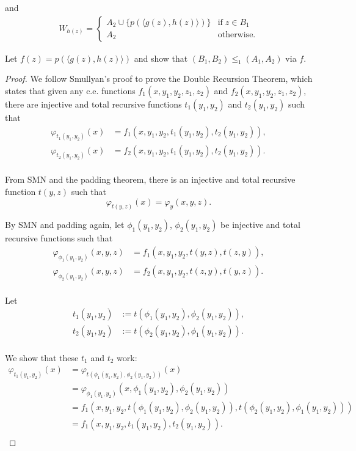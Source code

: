 \documentclass{article}
\begin{document}
\begin{enumerate}[label={\bf Q\arabic*:}]
    and
    \begin{align*}
      W_{h(z)}=
      \begin{cases}
        A_2\cup\{p(\langle g(z),h(z)\rangle)\} &\text{if}\; z\in B_1\\
        A_2 &\text{otherwise}.
      \end{cases}
    \end{align*}

    Let $f(z)=p(\langle g(z),h(z)\rangle)$ and show that
    $(B_1,B_2)\leq_1(A_1,A_2)$ via $f$.

    \begin{proof}
      We follow Smullyan's proof to prove the Double Recursion Theorem,
      which states that given any c.e. functions
      $f_1(x,y_1,y_2,z_1,z_2)$ and $f_2(x,y_1,y_2,z_1,z_2)$, there are
      injective and total recursive functions $t_1(y_1,y_2)$ and
      $t_2(y_1,y_2)$ such that
      \begin{align*}
        \varphi_{t_1(y_1,y_2)}(x)
          &=f_1(x,y_1,y_2,t_1(y_1,y_2),t_2(y_1,y_2)),\\
        \varphi_{t_2(y_1,y_2)}(x)
          &=f_2(x,y_1,y_2,t_1(y_1,y_2),t_2(y_1,y_2)).\\
      \end{align*}

      From SMN and the padding theorem, there is an injective and total
      recursive function $t(y,z)$ such that
      \[\varphi_{t(y,z)}(x) =\varphi_y(x,y,z).\]

      By SMN and padding again, let $\phi_1(y_1,y_2)$, $\phi_2(y_1,y_2)$ be
      injective and total recursive functions such that
      \begin{align*}
        \varphi_{\phi_1(y_1,y_2)}(x,y,z) &=f_1(x,y_1,y_2,t(y,z),t(z,y)),\\
        \varphi_{\phi_2(y_1,y_2)}(x,y,z) &=f_2(x,y_1,y_2,t(z,y),t(y,z)).\\
      \end{align*}

      Let
      \begin{align*}
        t_1(y_1,y_2) &:=t(\phi_1(y_1,y_2),\phi_2(y_1,y_2)),\\
        t_2(y_1,y_2) &:=t(\phi_2(y_1,y_2),\phi_1(y_1,y_2)).\\
      \end{align*}

      We show that these $t_1$ and $t_2$ work:
      \begin{align*}
        \varphi_{t_1(y_1,y_2)}(x)
          &=\varphi_{t(\phi_1(y_1,y_2),\phi_2(y_1,y_2))}(x)\\
        &=\varphi_{\phi_1(y_1,y_2)} (x,\phi_1(y_1,y_2),\phi_2(y_1,y_2))\\
        &=f_1(x,y_1,y_2, t(\phi_1(y_1,y_2),\phi_2(y_1,y_2)),
          t(\phi_2(y_1,y_2),\phi_1(y_1,y_2)))\\
        &=f_1(x,y_1,y_2,t_1(y_1,y_2),t_2(y_1,y_2)).\\
      \end{align*}


\end{proof}
\end{enumerate}
\end{document}
